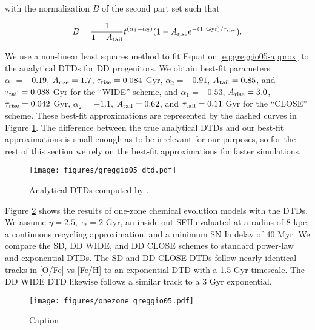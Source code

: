 \documentclass[twocolumn]{aastex631}
\begin{document}
\noindent with the normalization $B$ of the second part set such that

\begin{equation}
    B = \frac{1}{1 + A_{\rm{tail}}} t^{(\alpha_1-\alpha_2)} (1 - A_{\rm{rise}} e^{-(1~\rm{Gyr})/\tau_{\rm{rise}}}).
\end{equation}

\noindent We use a non-linear least squares method to fit Equation \ref{eq:greggio05-approx} to the analytical DTDs for DD progenitors. We obtain best-fit parameters $\alpha_1=-0.19$, $A_{\rm{rise}}=1.7$, $\tau_{\rm{rise}}=0.084$ Gyr, $\alpha_2=-0.91$, $A_{\rm{tail}}=0.85$, and $\tau_{\rm{tail}}=0.088$ Gyr for the ``WIDE'' scheme, and $\alpha_1=-0.53$, $A_{\rm{rise}}=3.0$, $\tau_{\rm{rise}}=0.042$ Gyr, $\alpha_2=-1.1$, $A_{\rm{tail}}=0.62$, and $\tau_{\rm{tail}}=0.11$ Gyr for the ``CLOSE'' scheme. These best-fit approximations are represented by the dashed curves in Figure \ref{fig:greggio05-dtd}. The difference between the true analytical DTDs and our best-fit approximations is small enough as to be irrelevant for our purposes, so for the rest of this section we rely on the best-fit approximations for faster simulations.

\begin{figure}
    \centering
    \texttt{[image: figures/greggio05\_dtd.pdf]}
    \caption{Analytical DTDs computed by \citet{Greggio2005-AnalyticalRates}.}
    \label{fig:greggio05-dtd}
\end{figure}

Figure \ref{fig:onezone-greggio05} shows the results of one-zone chemical evolution models with the \citet{Greggio2005-AnalyticalRates} DTDs. We assume $\eta=2.5$, $\tau_*=2$ Gyr, an inside-out SFH evaluated at a radius of 8 kpc, a continuous recycling approximation, and a minimum SN Ia delay of 40 Myr. We compare the SD, DD WIDE, and DD CLOSE schemes to standard power-law and exponential DTDs. The SD and DD CLOSE DTDs follow nearly identical tracks in [O/Fe] vs [Fe/H] to an exponential DTD with a 1.5 Gyr timescale. The DD WIDE DTD likewise follows a similar track to a 3 Gyr exponential.

\begin{figure}
    \centering
    \texttt{[image: figures/onezone\_greggio05.pdf]}
    \caption{Caption}
    \label{fig:onezone-greggio05}
\end{figure}


\end{document}
